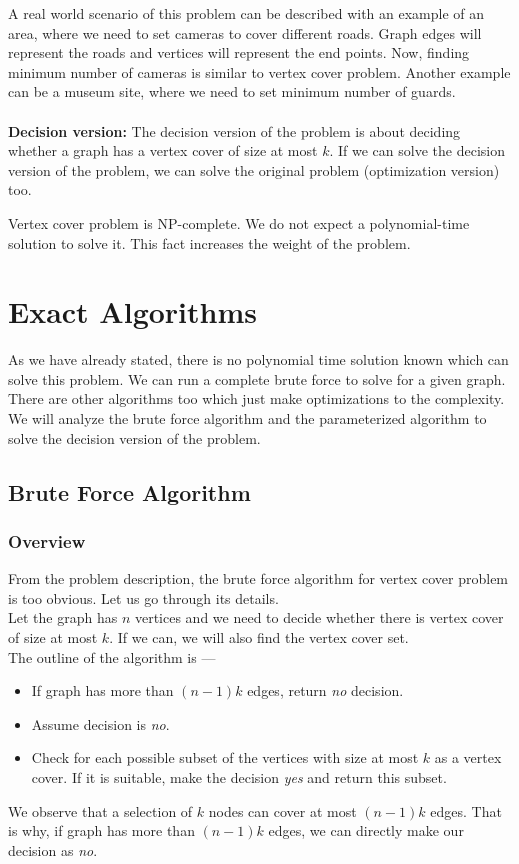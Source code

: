\documentclass[12pt, a4paper]{article}
\begin{document}
	\par
	A real world scenario of this problem can be described with an example of an area, where we need to set cameras to cover different roads. Graph edges will represent the roads and vertices will represent the end points. Now, finding minimum number of cameras is similar to vertex cover problem. Another example can be a museum site, where we need to set minimum number of guards.\\ \\
	\textbf{Decision version:} The decision version of the problem is about deciding whether a graph has a vertex cover of size at most $k$.
	If we can solve the decision version of the problem, we can solve the original problem (optimization version) too.
	\par
	Vertex cover problem is NP-complete. We do not expect a polynomial-time solution to solve it. This fact increases the weight of the problem.
	
	
	\pagebreak
	\section{Exact Algorithms}
	As we have already stated, there is no polynomial time solution known which can solve this problem. We can run a complete brute force to solve for a given graph. There are other algorithms too which just make optimizations to the complexity. We will analyze the brute force algorithm and the parameterized algorithm to solve the decision version of the problem.
	\subsection{Brute Force Algorithm}
	\subsubsection{Overview}
	From the problem description, the brute force algorithm for vertex cover problem is too obvious. Let us go through its details. \\
	Let the graph has $n$ vertices and we need to decide whether there is vertex cover of size at most $k$. If we can, we will also find the vertex cover set.\\
	The outline of the algorithm is ---
	\begin{itemize}
		\item If graph has more than $(n-1)k$ edges, return \textit{no} decision.
		\item Assume decision is \textit{no}.
		\item Check for each possible subset of the vertices with size at most $k$ as a vertex cover. If it is suitable, make the decision \textit{yes} and return this subset.
	\end{itemize}
	We observe that a selection of $k$ nodes can cover at most $(n-1)k$ edges. That is why, if graph has more than $(n-1)k$ edges, we can directly make our decision as \textit{no}.
	
\end{document}
